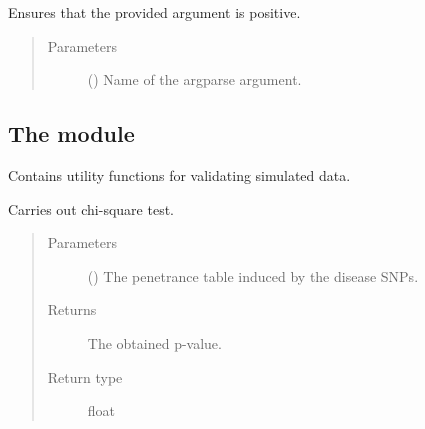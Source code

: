 \documentclass[a4paper,10pt,english]{sphinxhowto}
\begin{document}

\begin{fulllineitems}
\label{\detokenize{utils:utils.argparse_checks.check_positive}}
Ensures that the provided argument is positive.
\begin{quote}\begin{description}
\item[{Parameters}] \leavevmode
{} () \textendash{} Name of the argparse argument.

\end{description}\end{quote}

\end{fulllineitems}



\subsection{The module }
\label{\detokenize{utils:module-utils.validation_utils}}\label{\detokenize{utils:the-module-utils-validation-utils-py}}
Contains utility functions for validating simulated data.

\begin{fulllineitems}
\label{\detokenize{utils:utils.validation_utils.chi_square}}
Carries out chi-square test.
\begin{quote}\begin{description}
\item[{Parameters}] \leavevmode
{} () \textendash{} The penetrance table induced by the disease SNPs.

\item[{Returns}] \leavevmode
The obtained p-value.

\item[{Return type}] \leavevmode
float

\end{description}\end{quote}

\end{fulllineitems}
\end{document}
